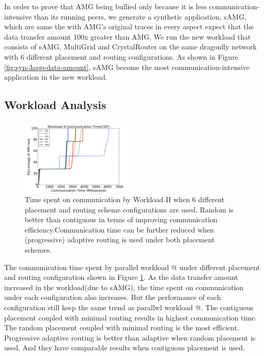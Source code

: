 \documentclass[conference,compsoc]{IEEEtran}
\makeatletter
\newcommand{\Rmnum}[1]{\expandafter\@slowromancap\romannumeral #1@}
\makeatother
\begin{document}
In order to prove that AMG being bullied only because it is less communication-intensive than its running peers, we generate a synthetic application, sAMG, which are same the with AMG's original traces in every aspect expect that the data transfer amount 100x greater than AMG. We run the new workload that consists of sAMG, MultiGrid and CrystalRouter on the same dragonfly network with 6 different placement and routing configurations. As shown in Figure \ref{fig:syn-3app-data-amount}, sAMG become the most communication-intensive application in the new workload. 

\subsection{Workload Analysis}

\begin{figure}[h!]
  \centering
  \includegraphics[width = 0.48\textwidth ]{syn-wkld/wkld-commtime}
  \caption{ Time spent on communication by Workload II when 6 different placement and routing scheme configurations are used. Random is better than contiguous in terms of improving communication efficiency.Communication time can be further reduced when (progressive) adaptive routing is used under both placement schemes. }
  \label{fig:syn-wkld-commtime}
\end{figure}

The communication time spent by parallel workload \Rmnum{2} under different placement and routing configuration shown in Figure \ref{fig:syn-wkld-commtime}. As the data transfer amount increased in the workload(due to sAMG), the time spent on communication under each configuration also increases. But the performance of each configuration still keep the same trend as parallwl workload \Rmnum{1}. The contiguous placement coupled with minimal routing results in highest communication time. The random placement coupled with minimal routing is the most efficient. Progressive adaptive routing is better than adaptive when random placement is used. And they have comparable results when contiguous placement is used. 
\end{document}
